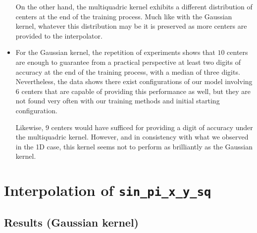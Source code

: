 \documentclass[12pt]{report} %
\begin{document}
\begin{itemize}
        On the other hand, the multiquadric kernel exhibits a different distribution of
        centers at the end of the training process. Much like with the Gaussian kernel,
        whatever this distribution may be it is preserved as more centers are provided
        to the interpolator.

  \item For the Gaussian kernel, the repetition of experiments shows that
        $10$ centers are enough to guarantee
        from a practical perspective at least two digits of accuracy at the end of the
        training process, with a median of three digits. Nevertheless, the data shows
        there exist configurations of our model involving 6 centers that are capable of
        providing this performance as well, but they are not found very often with our
        training methods and initial starting configuration.

        Likewise, 9 centers would have sufficed for providing a digit of accuracy under
        the multiquadric kernel. However, and in consistency with what we observed in the
        1D case, this kernel seems not to perform as brilliantly as the Gaussian kernel.
\end{itemize}

\section{Interpolation of \texttt{sin\_pi\_x\_y\_sq}}\label{sec:interp2d-experiment2}

\subsection*{Results (Gaussian kernel)}

\end{document}
